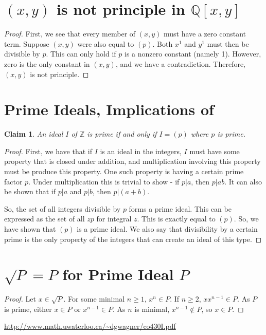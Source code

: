 \documentclass[12pt]{article}
\newtheorem*{claim*}{Claim}
\begin{document}
\section{$(x, y)$ is not principle in $\mathbb{Q}[x,y]$}
\begin{proof}
First, we see that every member of $(x, y)$ must have a zero constant term. Suppose $(x, y)$ were also equal to $(p)$. Both $x^1$ and $y^1$ must then be divisible by $p$. This can only hold if $p$ is a nonzero constant (namely 1). However, zero is the only constant in $(x, y)$, and we have a contradiction. Therefore, $(x, y)$ is not principle. 
\end{proof}


\section{Prime Ideals, Implications of}
\begin{claim*}
An ideal $I$ of $\mathbb{Z}$ is prime if and only if $I = (p)$ where $p$ is prime.
\end{claim*}
\begin{proof}
First, we have that if $I$ is an ideal in the integers, $I$ must have some property that is closed under addition, and multiplication involving this property must be produce this property. One such property is having a certain prime factor $p$. Under multiplication this is trivial to show - if $p | a$, then $p | ab$. It can also be shown that if $p | a$ and $p | b$, then $p | (a + b)$.

So, the set of all integers divisible by $p$ forms a prime ideal. This can be expressed as the set of all $zp$ for integral $z$. This is exactly equal to $(p)$. So, we have shown that $(p)$ is a prime ideal. We also say that divisibility by a certain prime is the only property of the integers that can create an ideal of this type.
\end{proof}

\section{$\sqrt{P} = P$ for Prime Ideal $P$}
\begin{proof}
Let $x \in \sqrt{P}$. For some minimal $n \geq 1$, $x ^ n \in P$. If $n \geq 2$, $x x^{n - 1} \in P$. As $P$ is prime, either $x \in P$ or $x ^ {n - 1} \in P$. As $n$ is minimal, $x ^ {n - 1} \notin P$, so $x \in P$. 
\end{proof}

\begin{thebibliography}{9}
 \url{http://www.math.uwaterloo.ca/~dgwagner/co430I.pdf}
\end{thebibliography}
\end{document}
